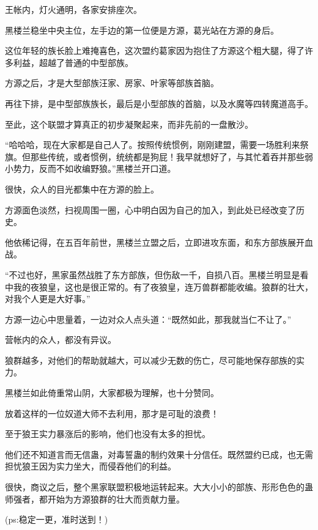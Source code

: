 \begin{this_body}
王帐内，灯火通明，各家安排座次。

黑楼兰稳坐中央主位，左手边的第一位便是方源，葛光站在方源的身后。

这位年轻的族长脸上难掩喜色，这次盟约葛家因为抱住了方源这个粗大腿，得了许多利益，超越了普通的中型部族。

方源之后，才是大型部族汪家、房家、叶家等部族首脑。

再往下排，是中型部族族长，最后是小型部族的首脑，以及水魔等四转魔道高手。

至此，这个联盟才算真正的初步凝聚起来，而非先前的一盘散沙。

“哈哈哈，现在大家都是自己人了。按照传统惯例，刚刚建盟，需要一场胜利来祭旗。但那些传统，或者惯例，统统都是狗屁！我早就想好了，与其忙着吞并那些弱小势力，反而不如收编野狼。”黑楼兰开口道。

很快，众人的目光都集中在方源的脸上。

方源面色淡然，扫视周围一圈，心中明白因为自己的加入，到此处已经改变了历史。

他依稀记得，在五百年前世，黑楼兰立盟之后，立即进攻东面，和东方部族展开血战。

“不过也好，黑家虽然战胜了东方部族，但伤敌一千，自损八百。黑楼兰明显是看中我的夜狼皇，这也是很正常的。有了夜狼皇，连万兽群都能收编。狼群的壮大，对我个人更是大好事。”

方源一边心中思量着，一边对众人点头道：“既然如此，那我就当仁不让了。”

营帐内的众人，都没有异议。

狼群越多，对他们的帮助就越大，可以减少无数的伤亡，尽可能地保存部族的实力。

黑楼兰如此倚重常山阴，大家都极为理解，也十分赞同。

放着这样的一位奴道大师不去利用，那才是可耻的浪费！

至于狼王实力暴涨后的影响，他们也没有太多的担忧。

他们还不知道言而无信蛊，对毒誓蛊的制约效果十分信任。既然盟约已成，也无需担忧狼王因为实力坐大，而侵吞他们的利益。

很快，商议之后，整个黑家联盟积极地运转起来。大大小小的部族、形形色色的蛊师强者，都开始为方源狼群的壮大而贡献力量。

(ps:稳定一更，准时送到！)

\end{this_body}

